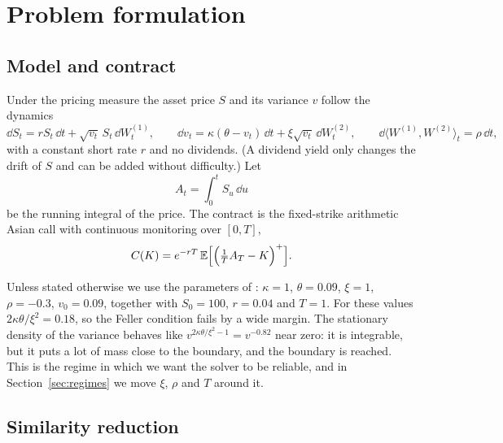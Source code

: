 \section{Problem formulation}\label{sec:problem}

\subsection{Model and contract}

Under the pricing measure the asset price $S$ and its variance $v$ follow the \citet{Heston1993} dynamics
\begin{equation}\label{eq:heston}
\dd S_t = r S_t\,\dd t + \sqrt{v_t}\,S_t\,\dd W^{(1)}_t,\qquad
\dd v_t = \kappa(\theta - v_t)\,\dd t + \xi\sqrt{v_t}\,\dd W^{(2)}_t,\qquad
\dd\langle W^{(1)},W^{(2)}\rangle_t = \rho\,\dd t,
\end{equation}
with a constant short rate $r$ and no dividends. (A dividend yield only changes the drift of $S$ and can
be added without difficulty.) Let
\begin{equation*}
A_t = \int_0^t S_u\,\dd u
\end{equation*}
be the running integral of the price. The contract is the fixed-strike arithmetic Asian call with
continuous monitoring over $[0,T]$,
\begin{equation}\label{eq:price}
C(K) = e^{-rT}\,\mathbb{E}\Bigl[\Bigl(\tfrac{1}{T}A_T - K\Bigr)^{+}\Bigr].
\end{equation}

Unless stated otherwise we use the parameters of \citet[Table~2]{Corsaro2019}: $\kappa=1$, $\theta=0.09$,
$\xi=1$, $\rho=-0.3$, $v_0=0.09$, together with $S_0=100$, $r=0.04$ and $T=1$. For these values
$2\kappa\theta/\xi^2 = 0.18$, so the Feller condition fails by a wide margin. The stationary density of the
variance behaves like $v^{2\kappa\theta/\xi^2-1}=v^{-0.82}$ near zero: it is integrable, but it puts a lot
of mass close to the boundary, and the boundary is reached. This is the regime in which we want the solver
to be reliable, and in Section~\ref{sec:regimes} we move $\xi$, $\rho$ and $T$ around it.

\subsection{Similarity reduction}

